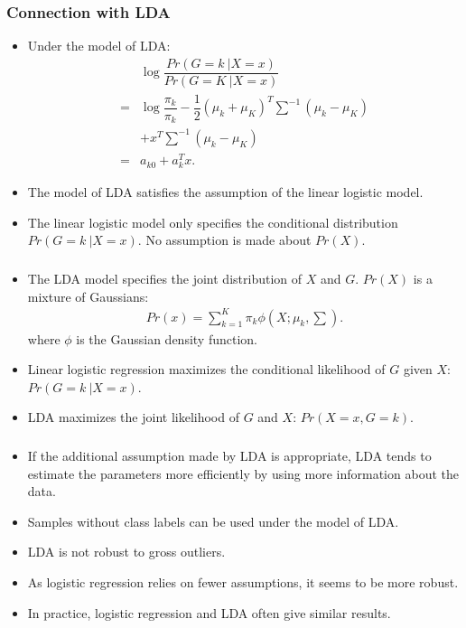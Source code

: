 \documentclass[12pt,notes,mathserif]{beamer}
\begin{document}
\begin{frame}[c]
	\frametitle{Connection with LDA}
	\begin{itemize}
		\item  Under the model of LDA:
		      \begin{align*}
			        & \log \dfrac{Pr(G=k~|X=x)}{Pr(G=K~|X=x)}                                              \\
			      = & \log \dfrac{\pi_k}{\pi_k}-\dfrac{1}{2}(\mu_k+\mu_K)^T\sum\nolimits^{-1}(\mu_k-\mu_K) \\
			        & +x^T\sum\nolimits^{-1}(\mu_k-\mu_K)                                                  \\
			      = & a_{k0}+a_k^Tx.
		      \end{align*}
		\item  The model of LDA satisfies the assumption of the linear logistic model.
		\item  The linear logistic model only specifies the conditional distribution $Pr(G = k~| X = x)$. No assumption is made about $Pr(X)$.
	\end{itemize}
\end{frame}

\begin{frame}[c]
	\frametitle{}
	\begin{itemize}
		\item  The LDA model specifies the joint distribution of $X$ and $G$. $Pr(X)$ is a mixture of Gaussians:
		      \begin{eqnarray*}
			      Pr(x)=\sum\limits_{k=1}^{K}\pi_k\phi\left(X;\mu_k,\sum\right).
		      \end{eqnarray*}
		      where $\phi$ is the Gaussian density function.
		\item  Linear logistic regression maximizes the conditional likelihood of $G$ given $X$: $Pr(G = k~| X = x)$.
		\item  LDA maximizes the joint likelihood of $G$ and $X$: $Pr(X = x,G = k)$.
	\end{itemize}
\end{frame}

\begin{frame}[c]
	\frametitle{}
	\begin{itemize}
		\item  If the additional assumption made by LDA is appropriate, LDA tends to estimate the parameters more efficiently by using more information about the data.

		\item  Samples without class labels can be used under the model of LDA.

		\item  LDA is not robust to gross outliers.

		\item  As logistic regression relies on fewer assumptions, it seems to be more robust.

		\item  In practice, logistic regression and LDA often give similar results.
	\end{itemize}
\end{frame}
\end{document}
